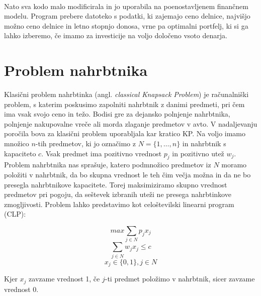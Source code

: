 \documentclass[a4paper,12pt]{article}
\theoremstyle{definition}
\begin{document}
\paragraph{}
Nato sva kodo malo modificirala in jo uporabila na poenostavljenem finančnem modelu. 
Program prebere datoteko s podatki, ki zajemajo ceno delnice, najvišjo možno ceno delnice in letno stopnjo donosa, vrne pa 
optimalni portfelj, ki si ga lahko izberemo, če imamo za investicije na voljo  določeno vsoto denarja.




\newpage
\section{Problem nahrbtnika}
\medskip
Klasični problem nahrbtinka (angl. \textit{classical Knapsack Problem}) je računalniški problem, s katerim poskusimo zapolniti 
nahrbtnik z danimi predmeti, pri čem ima vsak svojo ceno in težo. Bodisi gre za dejansko polnjenje nahrbtnika, polnjenje 
nakupovalne vreče ali morda zlaganje predmetov v avto. V nadaljevanju poročila bova za klasični problem uporabljala kar kratico KP. 
Na voljo imamo množico $n$-tih predmetov, ki jo označimo z $N = \{1, \dots, n\}$ in nahrbtnik s kapaciteto $c$. Vsak predmet ima 
pozitivno vrednost $p_{j}$ in pozitivno utež $w_{j}$. Problem nahrbtnika nas sprašuje, katero podmnožico predmetov iz $N$ moramo 
položiti v nahrbtnik, da bo skupna vrednost le teh čim večja možna in da ne bo presegla nahrbtnikove kapacitete. 
Torej maksimiziramo skupno vrednost predmetov pri pogoju, da seštevek izbranih uteži ne presega nahrbtinkove zmogljivosti.
Problem lahko predstavimo kot celoštevilski linearni program (CLP):


\begin{equation}
    \tag*{}
     max \sum_{j \in N} p_{j}x_{j}
\end{equation}
\begin{equation}
    \tag*{}
    \sum_{j \in N} w_{j}x_{j} \leq c
\end{equation}
\begin{equation}
    \tag*{}
    x_{j} \in \{0,1\}, j \in N
\end{equation}

\medskip
\noindent Kjer $x_{j}$ zavzame vrednost 1, če $j$-ti predmet položimo v nahrbtnik,
 sicer zavzame vrednost 0. 
\end{document}

